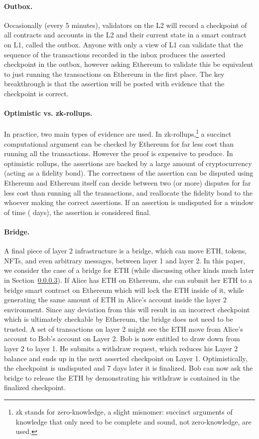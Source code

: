 \paragraph{Outbox.} Occasionally (\eg every 5 minutes), validators on the L2 will record a checkpoint of all contracts and accounts in the L2 and their current state in a smart contract on L1, called the outbox. Anyone with only a view of L1 can validate that the sequence of the transactions recorded in the inbox produces the asserted checkpoint in the outbox, however asking Ethereum to validate this be equivalent to just running the transactions on Ethereum in the first place. The key breakthrough is that the assertion will be posted with evidence that the checkpoint is correct.

\paragraph{Optimistic vs. zk-rollups.} In practice, two main types of evidence are used. In zk-rollups,\footnote{zk stands for zero-knowledge, a slight misnomer: succinct arguments of knowledge that only need to be complete and sound, not zero-knowledge, are used.} a succinct computational argument can be checked by Ethereum for far less cost than running all the transactions. However the proof is expensive to produce. In optimistic rollups, the assertions are backed by a large amount of cryptocurrency (acting as a fidelity bond). The correctness of the assertion can be disputed using Ethereum and Ethereum itself can decide between two (or more) disputes for far less cost than running all the transactions, and reallocate the fidelity bond to the whoever making the correct assertions. If an assertion is undisputed for a window of time ( days), the assertion is considered final.

\paragraph{Bridge.} A final piece of layer 2 infrastructure is a bridge, which can move ETH, tokens, NFTs, and even arbitrary messages, between layer 1 and layer 2. In this paper, we consider the case of a bridge for ETH (while discussing other kinds much later in Section~\ref{}). If Alice has ETH on Ethereum, she can submit her ETH to a bridge smart contract on Ethereum which will lock the ETH inside of it, while generating the same amount of ETH in Alice's account inside the layer 2 environment. Since any deviation from this will result in  an incorrect checkpoint which is ultimately checkable by Ethereum, the bridge does not need to be trusted. A set of transactions on layer 2 might see the ETH move from Alice's account to Bob's account on Layer 2. Bob is now entitled to draw down from layer 2 to layer 1. He submits a withdraw request, which reduces his Layer 2 balance and ends up in the next asserted checkpoint on Layer 1. Optimistically, the checkpoint is undisputed and 7 days later it is finalized. Bob can now ask the bridge to release the ETH by demonstrating his withdraw is contained in the finalized checkpoint.

